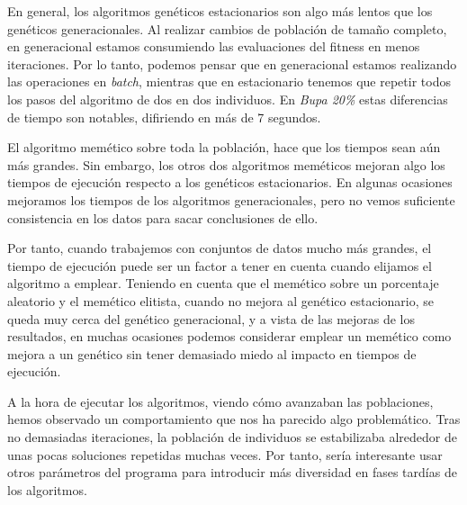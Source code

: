 \documentclass[11pt]{article}
\begin{document}
En general, los algoritmos genéticos estacionarios son algo más lentos que los genéticos generacionales. Al realizar cambios de población de tamaño completo, en generacional estamos consumiendo las evaluaciones del fitness en menos iteraciones. Por lo tanto, podemos pensar que en generacional estamos realizando las operaciones en \emph{batch}, mientras que en estacionario tenemos que repetir todos los pasos del algoritmo de dos en dos individuos. En \emph{Bupa 20\%} estas diferencias de tiempo son notables, difiriendo en más de 7 segundos.

El algoritmo memético sobre toda la población, hace que los tiempos sean aún más grandes. Sin embargo, los otros dos algoritmos meméticos mejoran algo los tiempos de ejecución respecto a los genéticos estacionarios. En algunas ocasiones mejoramos los tiempos de los algoritmos generacionales, pero no vemos suficiente consistencia en los datos para sacar conclusiones de ello.

Por tanto, cuando trabajemos con conjuntos de datos mucho más grandes, el tiempo de ejecución puede ser un factor a tener en cuenta cuando elijamos el algoritmo a emplear. Teniendo en cuenta que el memético sobre un porcentaje aleatorio y el memético elitista, cuando no mejora al genético estacionario, se queda muy cerca del genético generacional, y a vista de las mejoras de los resultados, en muchas ocasiones podemos considerar emplear un memético como mejora a un genético sin tener demasiado miedo al impacto en tiempos de ejecución.

A la hora de ejecutar los algoritmos, viendo cómo avanzaban las poblaciones, hemos observado un comportamiento que nos ha parecido algo problemático. Tras no demasiadas iteraciones, la población de individuos se estabilizaba alrededor de unas pocas soluciones repetidas muchas veces. Por tanto, sería interesante usar otros parámetros del programa para introducir más diversidad en fases tardías de los algoritmos.

\pagebreak



\end{document}
